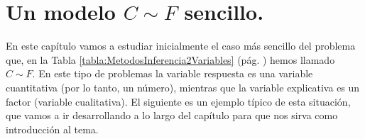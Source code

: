 
%
%
%
%

\section{Un modelo $C\sim F$ sencillo.}

En este capítulo vamos a estudiar inicialmente el caso más sencillo del problema que, en la Tabla
\ref{tabla:MetodosInferencia2Variables} (pág. \pageref{tabla:MetodosInferencia2Variables}) hemos
llamado $C \sim F$. En este tipo de problemas la variable respuesta es una variable cuantitativa
(por lo tanto, un número), mientras que la variable explicativa es un factor (variable
cualitativa).  El siguiente es un ejemplo típico de esta situación, que vamos a ir desarrollando a
lo largo del capítulo para que nos sirva como introducción al tema.

